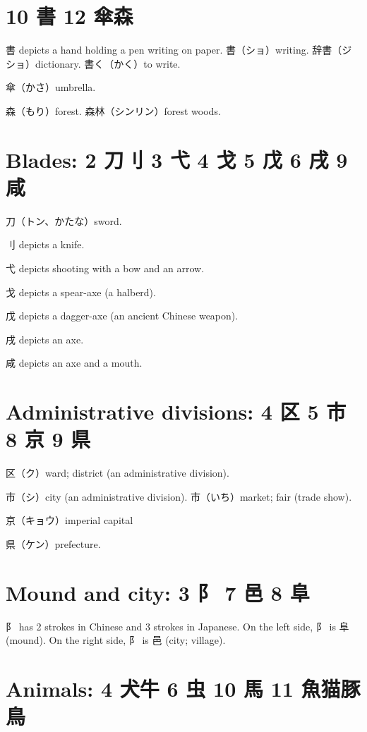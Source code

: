 \section{10 書 12 傘森}

書 depicts a hand holding a pen writing on paper.
書（ショ）writing.
辞書（ジショ）dictionary.
書く（かく）to write.

傘（かさ）umbrella.

森（もり）forest.
森林（シンリン）forest woods.

\section{Blades: 2 刀刂 3 弋 4 戈 5 戊 6 戌 9 咸}

刀（トン、かたな）sword.

刂 depicts a knife.

弋 depicts shooting with a bow and an arrow.

戈 depicts a spear-axe (a halberd).

戊 depicts a dagger-axe (an ancient Chinese weapon).

戌 depicts an axe.

咸 depicts an axe and a mouth.

\section{Administrative divisions: 4 区 5 市 8 京 9 県}


区（ク）ward; district (an administrative division).

市（シ）city (an administrative division).
市（いち）market; fair (trade show).

京（キョウ）imperial capital

県（ケン）prefecture.

\section{Mound and city: 3 阝 7 邑 8 阜}

阝 has 2 strokes in Chinese and 3 strokes in Japanese.
On the left side, 阝 is 阜 (mound).
On the right side, 阝 is 邑 (city; village).

\section{Animals: 4 犬牛 6 虫 10 馬 11 魚猫豚鳥}

